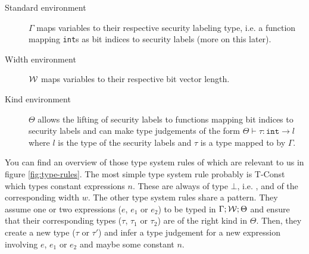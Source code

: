 \begin{description}
    \item[Standard environment] $ \Gamma $ maps variables to their respective security labeling type, i.e. a function mapping \texttt{int}s as bit indices to security labels (more on this later).
    \item[Width environment] $ \mathcal{W} $ maps variables to their respective bit vector length.
    \item[Kind environment] $ \Theta $ allows the lifting of security labels to functions mapping bit indices to security labels and can make type judgements of the form $ \Theta \vdash \tau : \texttt{int} \rightarrow l $ where $ l $ is the type of the security labels and $ \tau $ is a type mapped to by $ \Gamma $.
\end{description}

You can find an overview of those type system rules of \cite{Ferraiuolo17} which are relevant to us in figure \ref{fig:type-rules}.
The most simple type system rule probably is T-Const which types constant expressions $ n $.
These are always of type $ \bot $, i.e. \PT, and of the corresponding width $ w $.
The other type system rules share a pattern.
They assume one or two expressions ($ e $, $ e_1 $ or $ e_2 $) to be typed in $ \Gamma; \mathcal{W}; \Theta $ and ensure that their corresponding types ($ \tau $, $ \tau_1 $ or $ \tau_2 $) are of the right kind in $ \Theta $.
Then, they create a new type ($ \tau $ or $ \tau' $) and infer a type judgement for a new expression involving $ e $, $ e_1 $ or $ e_2 $ and maybe some constant $ n $.

